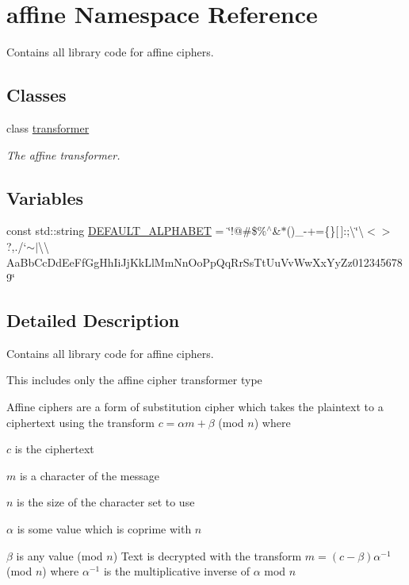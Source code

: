 \hypertarget{namespaceaffine}{}\section{affine Namespace Reference}
\label{namespaceaffine}


Contains all library code for affine ciphers.  


\subsection*{Classes}
\begin{DoxyCompactItemize}
\item 
class \hyperlink{classaffine_1_1transformer}{transformer}
\begin{DoxyCompactList}\small\item\em The affine transformer. \end{DoxyCompactList}\end{DoxyCompactItemize}
\subsection*{Variables}
\begin{DoxyCompactItemize}
\item 
const std\+::string \hyperlink{namespaceaffine_affbde77969645d73c99952c7f3259b83}{D\+E\+F\+A\+U\+L\+T\+\_\+\+A\+L\+P\+H\+A\+B\+ET} = \char`\"{}!@\#\$\%$^\wedge$\&$\ast$()\+\_\+-\/+=\{\}\mbox{[}$\,$\mbox{]}\+:;\textbackslash{}\char`\"{}\textbackslash{}\textquotesingle{}$<$$>$?,./`$\sim$$\vert$\textbackslash{}\textbackslash{} Aa\+Bb\+Cc\+Dd\+Ee\+Ff\+Gg\+Hh\+Ii\+Jj\+Kk\+Ll\+Mm\+Nn\+Oo\+Pp\+Qq\+Rr\+Ss\+Tt\+Uu\+Vv\+Ww\+Xx\+Yy\+Zz0123456789\char`\"{}
\end{DoxyCompactItemize}


\subsection{Detailed Description}
Contains all library code for affine ciphers. 

This includes only the affine cipher transformer type

Affine ciphers are a form of substitution cipher which takes the plaintext to a ciphertext using the transform $ c = \alpha m + \beta $ (mod $ n $) where
\begin{DoxyItemize}
\item $ c $ is the ciphertext
\item $ m $ is a character of the message
\item $ n $ is the size of the character set to use
\item $ \alpha $ is some value which is coprime with $ n $
\item $ \beta $ is any value (mod $ n $) Text is decrypted with the transform $ m = (c - \beta)\alpha^{-1} $ (mod $ n $) where $ \alpha^{-1} $ is the multiplicative inverse of $ \alpha $ mod $ n $
\end{DoxyItemize}

